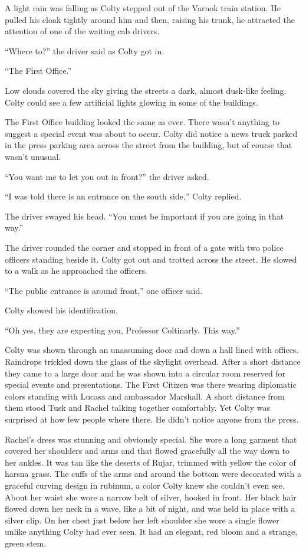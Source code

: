 A light rain was falling as Colty stepped out of the Varnok train station. He pulled his cloak
tightly around him and then, raising his trunk, he attracted the attention of one of the waiting
cab drivers.

``Where to?'' the driver said as Colty got in.

``The First Office.''

Low clouds covered the sky giving the streets a dark, almost dusk-like feeling. Colty could see
a few artificial lights glowing in some of the buildings.

The First Office building looked the same as ever. There wasn't anything to suggest a special
event was about to occur. Colty did notice a news truck parked in the press parking area across
the street from the building, but of course that wasn't unusual.

``You want me to let you out in front?'' the driver asked.

``I was told there is an entrance on the south side,'' Colty replied.

The driver swayed his head. ``You must be important if you are going in that way.''

The driver rounded the corner and stopped in front of a gate with two police officers standing
beside it. Colty got out and trotted across the street. He slowed to a walk as he approached the
officers.

``The public entrance is around front,'' one officer said.

Colty showed his identification.

``Oh yes, they are expecting you, Professor Coltinarly. This way.''

Colty was shown through an unassuming door and down a hall lined with offices. Raindrops
trickled down the glass of the skylight overhead. After a short distance they came to a large
door and he was shown into a circular room reserved for special events and presentations. The
First Citizen was there wearing diplomatic colors standing with Lucasa and ambassador Marshall.
A short distance from them stood Tusk and Rachel talking together comfortably. Yet Colty was
surprised at how few people where there. He didn't notice anyone from the press.

Rachel's dress was stunning and obviously special. She wore a long garment that covered her
shoulders and arms and that flowed gracefully all the way down to her ankles. It was tan like
the deserts of Rujar, trimmed with yellow the color of harsna grass. The cuffs of the arms and
around the bottom were decorated with a graceful curving design in rubinum, a color Colty knew
she couldn't even see. About her waist she wore a narrow belt of silver, hooked in front. Her
black hair flowed down her neck in a wave, like a bit of night, and was held in place with a
silver clip. On her chest just below her left shoulder she wore a single flower unlike anything
Colty had ever seen. It had an elegant, red bloom and a strange, green stem.

